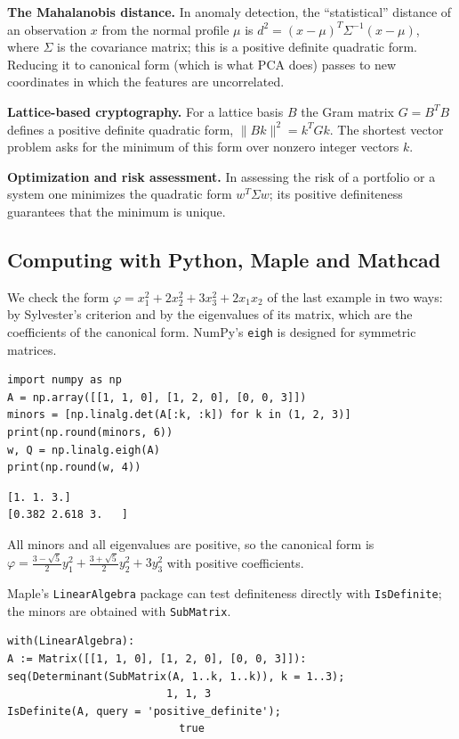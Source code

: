 \textbf{The Mahalanobis distance.} In anomaly detection, the
“statistical” distance of an observation $x$ from the normal profile
$\mu$ is $d^2=(x-\mu)^T\Sigma^{-1}(x-\mu)$, where $\Sigma$ is the
covariance matrix; this is a positive definite quadratic form. Reducing
it to canonical form (which is what PCA does) passes to new coordinates
in which the features are uncorrelated.

\textbf{Lattice-based cryptography.} For a lattice basis $B$ the Gram
matrix $G=B^TB$ defines a positive definite quadratic form,
$\|Bk\|^2=k^TGk$. The shortest vector problem asks for the minimum of this
form over nonzero integer vectors $k$.

\textbf{Optimization and risk assessment.} In assessing the risk of a
portfolio or a system one minimizes the quadratic form $w^T\Sigma w$;
its positive definiteness guarantees that the minimum is unique.

\subsection{Computing with Python, Maple and Mathcad}

We check the form $\varphi=x_1^2+2x_2^2+3x_3^2+2x_1x_2$ of the last
example in two ways: by Sylvester’s criterion and by the eigenvalues of
its matrix, which are the coefficients of the canonical form. NumPy’s
\texttt{eigh} is designed for symmetric matrices.
\begin{Verbatim}[fontsize=\footnotesize,frame=single,label={\small Python}]
import numpy as np
A = np.array([[1, 1, 0], [1, 2, 0], [0, 0, 3]])
minors = [np.linalg.det(A[:k, :k]) for k in (1, 2, 3)]
print(np.round(minors, 6))
w, Q = np.linalg.eigh(A)
print(np.round(w, 4))
\end{Verbatim}
\begin{Verbatim}[fontsize=\footnotesize,frame=single,label={\small Output}]
[1. 1. 3.]
[0.382 2.618 3.   ]
\end{Verbatim}
All minors and all eigenvalues are positive, so the canonical form is
$\varphi=\frac{3-\sqrt5}{2}y_1^2+\frac{3+\sqrt5}{2}y_2^2+3y_3^2$ with
positive coefficients.

Maple’s \texttt{LinearAlgebra} package can test definiteness directly
with \texttt{IsDefinite}; the minors are obtained with
\texttt{SubMatrix}.
\begin{Verbatim}[fontsize=\footnotesize,frame=single,label={\small Maple}]
with(LinearAlgebra):
A := Matrix([[1, 1, 0], [1, 2, 0], [0, 0, 3]]):
seq(Determinant(SubMatrix(A, 1..k, 1..k)), k = 1..3);
                         1, 1, 3
IsDefinite(A, query = 'positive_definite');
                           true
\end{Verbatim}

